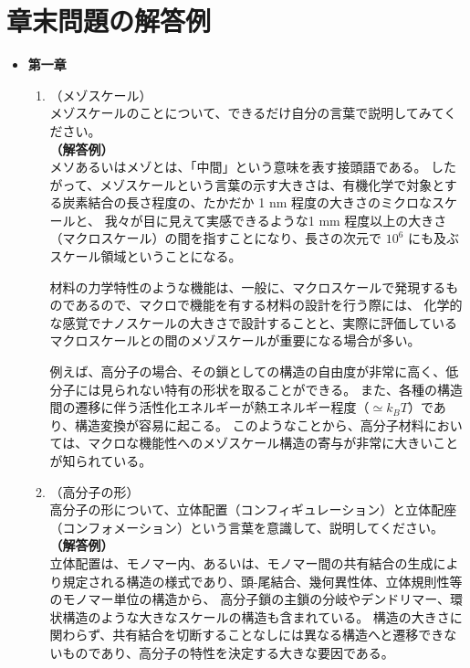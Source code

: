\documentclass[a4paper,11pt]{ltjsarticle}
\begin{document}
\newpage

\section{章末問題の解答例}

\begin{itemize}
\item
{\bf 第一章}

	\begin{enumerate}
		\item
		（メゾスケール）\\
		メゾスケールのことについて、できるだけ自分の言葉で説明してみてください。\\
		{\bf（解答例）}\\
		メソあるいはメゾとは、「中間」という意味を表す接頭語である。
		したがって、メゾスケールという言葉の示す大きさは、有機化学で対象とする炭素結合の長さ程度の、たかだか 1 nm 程度の大きさのミクロなスケールと、
		我々が目に見えて実感できるような1 mm 程度以上の大きさ（マクロスケール）の間を指すことになり、長さの次元で $10^6$ にも及ぶスケール領域ということになる。

		材料の力学特性のような機能は、一般に、マクロスケールで発現するものであるので、マクロで機能を有する材料の設計を行う際には、
		化学的な感覚でナノスケールの大きさで設計することと、実際に評価しているマクロスケールとの間のメゾスケールが重要になる場合が多い。

		例えば、高分子の場合、その鎖としての構造の自由度が非常に高く、低分子には見られない特有の形状を取ることができる。
		また、各種の構造間の遷移に伴う活性化エネルギーが熱エネルギー程度（$\simeq k_B T$）であり、構造変換が容易に起こる。
		このようなことから、高分子材料においては、マクロな機能性へのメゾスケール構造の寄与が非常に大きいことが知られている。

		\item
		（高分子の形）\\
		高分子の形について、立体配置（コンフィギュレーション）と立体配座（コンフォメーション）という言葉を意識して、説明してください。\\
		{\bf（解答例）}\\
		立体配置は、モノマー内、あるいは、モノマー間の共有結合の生成により規定される構造の様式であり、頭-尾結合、幾何異性体、立体規則性等のモノマー単位の構造から、
		高分子鎖の主鎖の分岐やデンドリマー、環状構造のような大きなスケールの構造も含まれている。
		構造の大きさに関わらず、共有結合を切断することなしには異なる構造へと遷移できないものであり、高分子の特性を決定する大きな要因である。


\end{enumerate}
\end{itemize}
\end{document}

